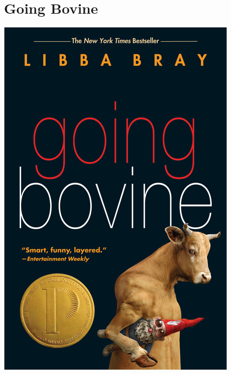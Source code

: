 \documentclass{tufte-handout}
\makeatletter
\newcommand{\varcaption}[2][0pt]{%
  \gsetlength{\@tufte@caption@vertical@offset}{-#1}%
  \gdef\@tufte@stored@varcaption{#2}%
}
\gdef\@tufte@stored@varcaption{} %
\makeatother
\begin{document}
\section*{Going Bovine}
\begin{marginfigure}[13\baselineskip]
   \includegraphics[width=\linewidth]{images/going_bovine.jpg}
   \varcaption{\href{https://www.penguinrandomhouse.com/books/17786/going-bovine-by-libba-bray/9780385733984/}{Publisher Link}, \href{https://www.amazon.com/Going-Bovine-Libba-Bray/dp/0385733984}{Amazon Link}}
\end{marginfigure}
\end{document}
